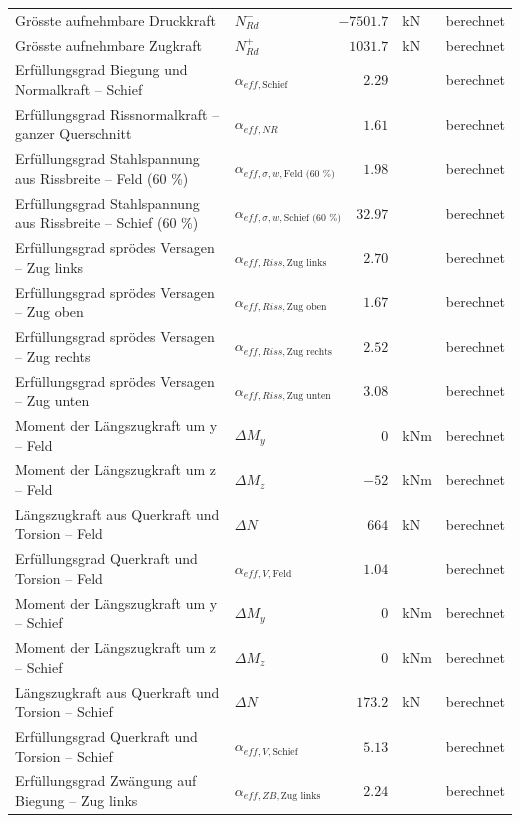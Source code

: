 \documentclass[11pt,a4paper]{article}
\begin{document}
\begin{xltabular}{\linewidth}{>{\raggedright\arraybackslash}Xlrll}
Grösste aufnehmbare Druckkraft & $N_{Rd}^{-}$ & $-7501.7$ & kN & berechnet \\
Grösste aufnehmbare Zugkraft & $N_{Rd}^{+}$ & $1031.7$ & kN & berechnet \\
Erfüllungsgrad Biegung und Normalkraft – Schief & $\alpha_{eff,\text{Schief}}$ & $2.29$ &  & berechnet \\
Erfüllungsgrad Rissnormalkraft – ganzer Querschnitt & $\alpha_{eff,NR}$ & $1.61$ &  & berechnet \\
Erfüllungsgrad Stahlspannung aus Rissbreite – Feld (60 \%) & $\alpha_{eff,\sigma,w,\text{Feld (60 \%)}}$ & $1.98$ &  & berechnet \\
Erfüllungsgrad Stahlspannung aus Rissbreite – Schief (60 \%) & $\alpha_{eff,\sigma,w,\text{Schief (60 \%)}}$ & $32.97$ &  & berechnet \\
Erfüllungsgrad sprödes Versagen – Zug links & $\alpha_{eff,Riss,\text{Zug links}}$ & $2.70$ &  & berechnet \\
Erfüllungsgrad sprödes Versagen – Zug oben & $\alpha_{eff,Riss,\text{Zug oben}}$ & $1.67$ &  & berechnet \\
Erfüllungsgrad sprödes Versagen – Zug rechts & $\alpha_{eff,Riss,\text{Zug rechts}}$ & $2.52$ &  & berechnet \\
Erfüllungsgrad sprödes Versagen – Zug unten & $\alpha_{eff,Riss,\text{Zug unten}}$ & $3.08$ &  & berechnet \\
Moment der Längszugkraft um y – Feld & $\Delta M_y$ & $0$ & kNm & berechnet \\
Moment der Längszugkraft um z – Feld & $\Delta M_z$ & $-52$ & kNm & berechnet \\
Längszugkraft aus Querkraft und Torsion – Feld & $\Delta N$ & $664$ & kN & berechnet \\
Erfüllungsgrad Querkraft und Torsion – Feld & $\alpha_{eff,V,\text{Feld}}$ & $1.04$ &  & berechnet \\
Moment der Längszugkraft um y – Schief & $\Delta M_y$ & $0$ & kNm & berechnet \\
Moment der Längszugkraft um z – Schief & $\Delta M_z$ & $0$ & kNm & berechnet \\
Längszugkraft aus Querkraft und Torsion – Schief & $\Delta N$ & $173.2$ & kN & berechnet \\
Erfüllungsgrad Querkraft und Torsion – Schief & $\alpha_{eff,V,\text{Schief}}$ & $5.13$ &  & berechnet \\
Erfüllungsgrad Zwängung auf Biegung – Zug links & $\alpha_{eff,ZB,\text{Zug links}}$ & $2.24$ &  & berechnet \\

\end{xltabular}
\end{document}

